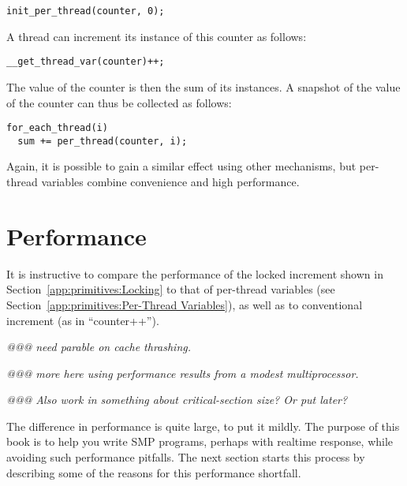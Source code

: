 \vspace{5pt}
\begin{minipage}[t]{\columnwidth}
\small
\begin{verbatim}
init_per_thread(counter, 0);
\end{verbatim}
\end{minipage}
\vspace{5pt}

A thread can increment its instance of this counter as follows:

\vspace{5pt}
\begin{minipage}[t]{\columnwidth}
\small
\begin{verbatim}
__get_thread_var(counter)++;
\end{verbatim}
\end{minipage}
\vspace{5pt}

The value of the counter is then the sum of its instances.
A snapshot of the value of the counter can thus be collected
as follows:

\vspace{5pt}
\begin{minipage}[t]{\columnwidth}
\small
\begin{verbatim}
for_each_thread(i)
  sum += per_thread(counter, i);
\end{verbatim}
\end{minipage}
\vspace{5pt}

Again, it is possible to gain a similar effect using other mechanisms,
but per-thread variables combine convenience and high performance.

\section{Performance}
\label{app:primitives:Performance}

It is instructive to compare the performance of the locked increment
shown in
Section~\ref{app:primitives:Locking}
to that of per-thread variables
(see Section~\ref{app:primitives:Per-Thread Variables}),
as well as to conventional increment (as in ``counter++'').

\emph{@@@ need parable on cache thrashing.}

\emph{@@@ more here using performance results from a modest multiprocessor.}

\emph{@@@ Also work in something about critical-section size? Or put later?}

The difference in performance is quite large, to put it mildly.
The purpose of this book is to help you write SMP programs,
perhaps with realtime response, while avoiding such performance
pitfalls.
The next section starts this process by describing some of the
reasons for this performance shortfall.
